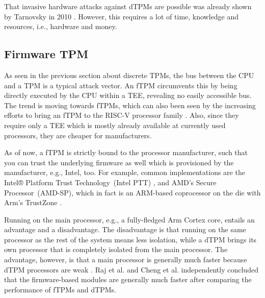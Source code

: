 That invasive hardware attacks against dTPMs are possible was already shown by Tarnovsky in 2010 \cite{tarnovsky}. However, this requires a lot of time, knowledge and resources, i.e., hardware and money.


\subsection{Firmware TPM}



As seen in the previous section about discrete TPMs, the bus between the CPU and a TPM is a typical attack vector. An fTPM \cite{Raj2015, 197213} circumvents this by being directly executed by the CPU within a \ac{TEE}, revealing no easily accessible bus.
The trend is moving towards fTPMs, which can also been seen by the increasing efforts to bring an fTPM to the RISC-V processor family \cite{Boubakri2021}. Also, since they require only a TEE which is mostly already available at currently used processors, they are cheaper for manufacturers.

As of now, a fTPM is strictly bound to the processor manufacturer, such that you can trust the underlying firmware as well which is provisioned by the manufacturer, e.g., Intel, too. For example, common implementations are the Intel® Platform Trust Technology~(Intel PTT) \cite{intelProcessorSecurity}, and AMD's Secure Processor~(AMD-SP), which in fact is an ARM-based coprocessor on the die with Arm's TrustZone \cite{Khalid2020}.

Running on the main processor, e.g., a fully-fledged Arm Cortex core, entails an advantage and a disadvantage. The disadvantage is that running on the same processor as the rest of the system means less isolation, while a \ac{dTPM} brings its own processor that is completely isolated from the main processor. The advantage, however, is that a main processor is generally much faster because \ac{dTPM} processors are weak \cite{Goh2013, Raj2015}. Raj et al. \cite{Raj2015} and Cheng et al. \cite{Cheng2020} independently concluded that the firmware-based modules are generally much faster after comparing the performance of \acp{fTPM} and \acp{dTPM}.


